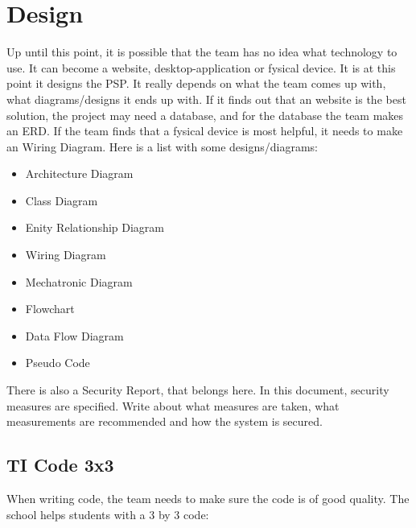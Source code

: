 \documentclass[10pt]{report}
\begin{document}
\newpage

\chapter{Design}
\thispagestyle{fancy}

Up until this point, it is possible that the team has no idea what technology to use. It can become a website, desktop-application or fysical device. It is at this point it designs the PSP. It really depends on what the team comes up with, what diagrams/designs it ends up with. If it finds out that an website is the best solution, the project may need a database, and for the database the team makes an ERD. If the team finds that a fysical device is most helpful, it needs to make an Wiring Diagram. Here is a list with some designs/diagrams:

\begin{itemize}
	\item Architecture Diagram
	\item Class Diagram
	\item Enity Relationship Diagram
	\item Wiring Diagram
	\item Mechatronic Diagram
	\item Flowchart
	\item Data Flow Diagram
	\item Pseudo Code
\end{itemize}

There is also a Security Report, that belongs here. In this document, security measures are specified. Write about what measures are taken, what measurements are recommended and how the system is secured.

\medskip
\minitoc

\newpage

\section{TI Code 3x3}

When writing code, the team needs to make sure the code is of good quality. The school helps students with a 3 by 3 code:
\end{document}
